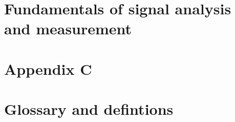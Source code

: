 \documentclass[12pt,twoside]{report} %
\begin{document}
\chapter{Fundamentals of signal analysis and measurement}\label{ch:app_B}

\chapter{Appendix C}\label{ch:app_B}

\chapter{Glossary and defintions}


\backmatter
\printbibliography
{}
\end{document}
